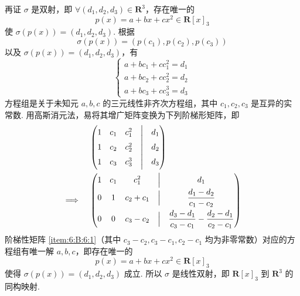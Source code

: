 \begin{enumerate}
          再证 $ \sigma $ 是双射，即 $ \forall (d_1, d_2, d_3) \in \mathbf{R}^3 $，存在唯一的
          \[ p(x) = a + bx + cx^2 \in \mathbf{R}[x]_3 \]
          使 $ \sigma(p(x)) = (d_1, d_2, d_3) $. 根据
          \[ \sigma(p(x)) = (p(c_1), p(c_2), p(c_3)) \]
          以及 $ \sigma(p(x)) = (d_1, d_2, d_3) $，有
          \[ \begin{cases}
                  a + bc_1 + cc_1^2 = d_1 \\
                  a + bc_2 + cc_2^2 = d_2 \\
                  a + bc_3 + cc_3^3 = d_3
              \end{cases} \]
          方程组是关于未知元 $ a, b, c $ 的三元线性非齐次方程组，其中 $ c_1, c_2, c_3 $ 是互异的实常数. 用高斯消元法，易将其增广矩阵变换为下列阶梯形矩阵，即
          \begin{align} %
                             & \begin{pmatrix}
                                   1 & c_1 & c_1^2 & \Bigm| & d_1 \\
                                   1 & c_2 & c_2^2 & \Bigm| & d_2 \\
                                   1 & c_3 & c_3^3 & \Bigm| & d_3
                               \end{pmatrix} \notag                                                                    \\
              \implies \quad & \begin{pmatrix}
                                   1 & c_1 & c_1^2     & \Bigm| & d_1                                                         \\[1ex]
                                   0 & 1   & c_2 + c_1 & \Bigm| & \dfrac{d_1 - d_2}{c_1 - c_2}                                \\[2ex]
                                   0 & 0   & c_3 - c_2 & \Bigm| & \dfrac{d_3 - d_1}{c_3 - c_1} - \dfrac{d_2 - d_1}{c_2 - c_1}
                               \end{pmatrix} \label{item:6:B:6:1}
          \end{align}
          阶梯性矩阵 \ref*{item:6:B:6:1}（其中 $ c_3 - c_2, c_3 - c_1, c_2 - c_1 $ 均为非零常数）对应的方程组有唯一解 $ a, b, c $，即存在唯一的
          \[ p(x) = a + bx + cx^2 \in \mathbf{R}[x]_3 \]
          使得 $ \sigma(p(x)) = (d_1, d_2, d_3) $ 成立. 所以 $ \sigma $ 是线性双射，即 $ \mathbf{R}[x]_3 $ 到 $ \mathbf{R}^3 $ 的同构映射.
\end{enumerate}

